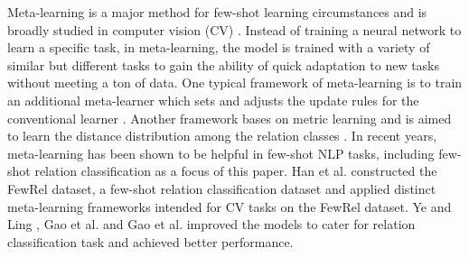 Meta-learning is a major method for few-shot learning circumstances and is broadly studied in computer vision (CV) \cite{LakeHuman,Santoro2016,proto}.
Instead of training a neural network to learn a specific task, in meta-learning, the model is trained with a variety of similar but different tasks to gain the ability of quick adaptation to new tasks without meeting a ton of data.
One typical framework of meta-learning is to train an additional meta-learner %
which sets and adjusts the update rules for the conventional learner \cite{Andry2016,Finn2017,HN}. Another framework bases on metric learning and is aimed to learn the distance distribution among the relation classes \cite{Koch2015,Vinyals2016,proto}.
In recent years, meta-learning has been shown to be helpful in few-shot NLP tasks, including few-shot relation classification as a focus of this paper.
Han et al.  constructed the FewRel dataset, a few-shot relation classification dataset and applied distinct meta-learning frameworks intended for CV tasks on the FewRel dataset. Ye and Ling , Gao et al.  and Gao et al.  improved the models to cater for relation classification task and achieved better performance.

